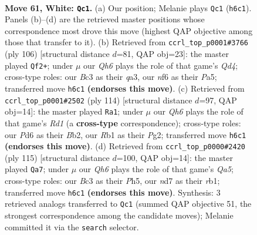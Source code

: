\documentclass[11pt]{article}
\begin{document}
\clearpage

\begin{figure}[p]\centering
\begin{subfigure}{0.46\textwidth}\centering
\resizebox{\linewidth}{!}{%
\newchessgame
\chessboard[
  setfen={3q2k1/3n1p2/b2P1n1Q/8/2p4P/p1B2pP1/P7/1R4K1 w - - 2 61},
  showmover=false,
  pgfstyle=straightmove, color=movearrow, markmove={h6-c1}
]}
\caption{}
\end{subfigure}\hfill
\begin{subfigure}{0.46\textwidth}\centering
\resizebox{\linewidth}{!}{%
\newchessgame
\chessboard[
  setfen={4n3/5p2/p2p1n2/P2P1k2/3Q4/q6P/6RK/8 w - - 2 54},
  showmover=false,
  pgfstyle=straightmove, color=movearrow, markmove={d4-f2}
]}
\caption{}
\end{subfigure}
\\[4pt]
\begin{subfigure}{0.46\textwidth}\centering
\resizebox{\linewidth}{!}{%
\newchessgame
\chessboard[
  setfen={8/1b2k3/4n2p/p1pn2pP/8/1PP2PK1/1B4P1/3R4 w - - 1 58},
  showmover=false,
  pgfstyle=straightmove, color=movearrow, markmove={d1-a1}
]}
\caption{}
\end{subfigure}\hfill
\begin{subfigure}{0.46\textwidth}\centering
\resizebox{\linewidth}{!}{%
\newchessgame
\chessboard[
  setfen={4r2k/5p2/2P2Pp1/1p4Pp/qN5P/5Q2/8/1R5K b - - 4 58},
  showmover=false,
  pgfstyle=straightmove, color=movearrow, markmove={a4-a7}
]}
\caption{}
\end{subfigure}
\caption{\textbf{Move 61, White: \texttt{Qc1}.} (a) Our position; Melanie plays \texttt{Qc1} (\texttt{h6c1}). Panels (b)--(d) are the retrieved master positions whose correspondence most drove this move (highest QAP objective among those that transfer to it). (b) Retrieved from \texttt{ccrl\_top\_p0001\#3766} (ply 106) [structural distance $d$=81, QAP obj=23]: the master played \texttt{Qf2+}; under $\mu$ our \emph{Qh6} plays the role of that game's \emph{Qd4}; cross-type roles: our \emph{B}c3 as their \emph{q}a3, our \emph{n}f6 as their \emph{P}a5; transferred move \texttt{h6c1} \textbf{(endorses this move)}. (c) Retrieved from \texttt{ccrl\_top\_p0001\#2502} (ply 114) [structural distance $d$=97, QAP obj=14]: the master played \texttt{Ra1}; under $\mu$ our \emph{Qh6} plays the role of that game's \emph{Rd1} (a \textbf{cross-type} correspondence); cross-type roles: our \emph{P}d6 as their \emph{B}b2, our \emph{R}b1 as their \emph{P}g2; transferred move \texttt{h6c1} \textbf{(endorses this move)}. (d) Retrieved from \texttt{ccrl\_top\_p0000\#2420} (ply 115) [structural distance $d$=100, QAP obj=14]: the master played \texttt{Qa7}; under $\mu$ our \emph{Qh6} plays the role of that game's \emph{Qa5}; cross-type roles: our \emph{B}c3 as their \emph{P}h5, our \emph{n}d7 as their \emph{r}b1; transferred move \texttt{h6c1} \textbf{(endorses this move)}. Synthesis: 3 retrieved analogs transferred to \texttt{Qc1} (summed QAP objective 51, the strongest correspondence among the candidate moves); Melanie committed it via the \texttt{search} selector.}
\label{fig:thought-m120}
\end{figure}
\end{document}
